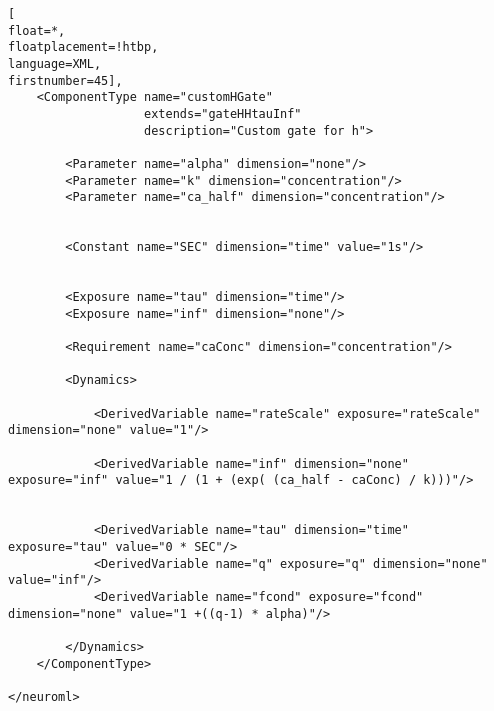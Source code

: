 \documentclass[10pt,a4paper]{article}
\begin{document}
\begin{lstlisting}[
float=*,
floatplacement=!htbp,
language=XML,
firstnumber=45],
    <ComponentType name="customHGate"
                   extends="gateHHtauInf"
                   description="Custom gate for h">

        <Parameter name="alpha" dimension="none"/>
        <Parameter name="k" dimension="concentration"/>
        <Parameter name="ca_half" dimension="concentration"/>


        <Constant name="SEC" dimension="time" value="1s"/>


        <Exposure name="tau" dimension="time"/>
        <Exposure name="inf" dimension="none"/>

        <Requirement name="caConc" dimension="concentration"/>

        <Dynamics>

            <DerivedVariable name="rateScale" exposure="rateScale" dimension="none" value="1"/>

            <DerivedVariable name="inf" dimension="none" exposure="inf" value="1 / (1 + (exp( (ca_half - caConc) / k)))"/>


            <DerivedVariable name="tau" dimension="time" exposure="tau" value="0 * SEC"/>
            <DerivedVariable name="q" exposure="q" dimension="none" value="inf"/>
            <DerivedVariable name="fcond" exposure="fcond" dimension="none" value="1 +((q-1) * alpha)"/>

        </Dynamics>
    </ComponentType>

</neuroml>
\end{lstlisting}
\end{document}
